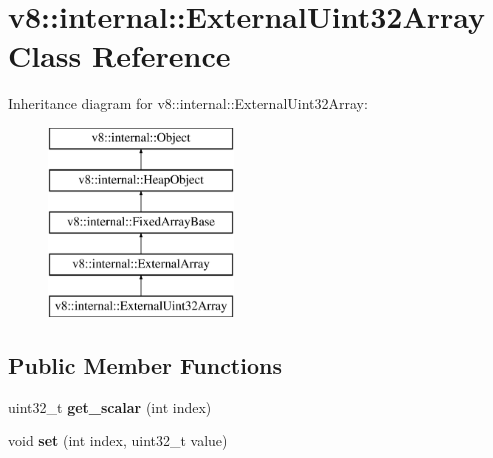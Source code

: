 \hypertarget{classv8_1_1internal_1_1_external_uint32_array}{}\section{v8\+:\+:internal\+:\+:External\+Uint32\+Array Class Reference}
\label{classv8_1_1internal_1_1_external_uint32_array}
Inheritance diagram for v8\+:\+:internal\+:\+:External\+Uint32\+Array\+:\begin{figure}[H]
\begin{center}
\leavevmode
\includegraphics[height=5.000000cm]{classv8_1_1internal_1_1_external_uint32_array}
\end{center}
\end{figure}
\subsection*{Public Member Functions}
\begin{DoxyCompactItemize}
\item 
\hypertarget{classv8_1_1internal_1_1_external_uint32_array_a9ab8385ef037fcfc5ff15a0c43087b76}{}uint32\+\_\+t {\bfseries get\+\_\+scalar} (int index)\label{classv8_1_1internal_1_1_external_uint32_array_a9ab8385ef037fcfc5ff15a0c43087b76}

\item 
\hypertarget{classv8_1_1internal_1_1_external_uint32_array_ae07c04857f7ed9b9009647b8489ef8c2}{}void {\bfseries set} (int index, uint32\+\_\+t value)\label{classv8_1_1internal_1_1_external_uint32_array_ae07c04857f7ed9b9009647b8489ef8c2}

\end{DoxyCompactItemize}
